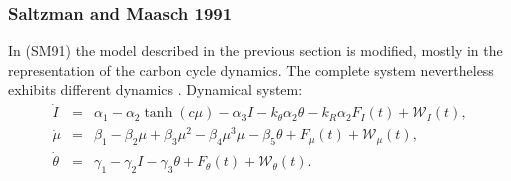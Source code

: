 \documentclass[12pt]{article}
\def\ba{\begin{eqnarray}}
\def\ea{\end{eqnarray}}
\begin{document}
\subsubsection{Saltzman and Maasch 1991}
In \cite{Saltzman:1991jl} (SM91) the model described in the previous section is modified, mostly in the representation of the carbon cycle dynamics. The complete system nevertheless exhibits different dynamics \cite{Crucifix2012a}.
Dynamical system:
\ba
\dot I &=& \alpha_1 - \alpha_2 \tanh(c\mu) - \alpha_3 I - k_{\theta}\alpha_2\theta - k_R\alpha_2 F_I(t)+\mathcal{W}_I(t),\\
\dot \mu &=& \beta_1 -\beta_2\mu + \beta_3\mu^2 -\beta_4 \mu^3\mu - \beta_5\theta + F_\mu(t) +\mathcal{W}_{\mu}(t),\\
\dot \theta &=& \gamma_1 -\gamma_2 I - \gamma_3 \theta + F_{\theta}(t) + \mathcal{W}_{\theta}(t).
\label{e:SM91full}
\ea
\end{document}
